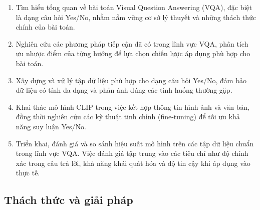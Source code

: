 \begin{enumerate}
\item Tìm hiểu tổng quan về bài toán Visual Question Answering (VQA), đặc biệt là dạng câu hỏi Yes/No, nhằm nắm vững cơ sở lý thuyết và những thách thức chính của bài toán.
\item Nghiên cứu các phương pháp tiếp cận đã có trong lĩnh vực VQA, phân tích ưu nhược điểm của từng hướng để lựa chọn chiến lược áp dụng phù hợp cho bài toán.
\item Xây dựng và xử lý tập dữ liệu phù hợp cho dạng câu hỏi Yes/No, đảm bảo dữ liệu có tính đa dạng và phản ánh đúng các tình huống thường gặp.
\item Khai thác mô hình CLIP trong việc kết hợp thông tin hình ảnh và văn bản, đồng thời nghiên cứu các kỹ thuật tinh chỉnh (fine-tuning) để tối ưu khả năng suy luận Yes/No.
\item Triển khai, đánh giá và so sánh hiệu suất mô hình trên các tập dữ liệu chuẩn trong lĩnh vực VQA. Việc đánh giá tập trung vào các tiêu chí như độ chính xác trong câu trả lời, khả năng khái quát hóa và độ tin cậy khi áp dụng vào thực tế.
\end{enumerate}

\subsection{Thách thức và giải pháp}

